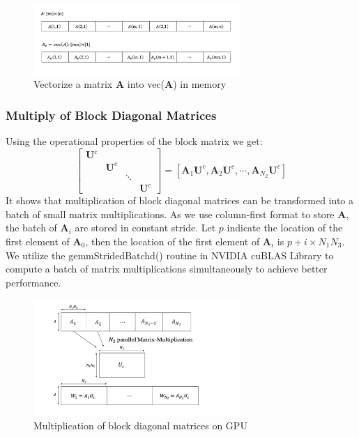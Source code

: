 \documentclass[futureinternet,article,submit,moreauthors,pdftex,10pt,a4paper]{Definitions/mdpi}
\theoremstyle{plain}
\theoremstyle{definition}
\theoremstyle{remark}
\begin{document}
\begin{figure}[H]
\centering
\includegraphics[width=0.7\textwidth]{vec2mat.png}
\caption{Vectorize a matrix $\mathbf{A}$ into vec($\mathbf{A}$) in memory}
\label{Fig:vec2mat}
\end{figure}

\subsubsection{Multiply of Block Diagonal Matrices}
Using the operational properties of the block matrix we get:
\begin{equation}
        [\mathbf{A}_1, \mathbf{A}_2, \cdots, \mathbf{A}_{N_2}]
        \begin{bmatrix}
            \mathbf{U}^c & & & \\
            & \mathbf{U}^c & & \\
            & & \ddots & \\
            & & & \mathbf{U}^c
        \end{bmatrix}
        =
        [\mathbf{A}_1\mathbf{U}^c, \mathbf{A}_2\mathbf{U}^c, \cdots, \mathbf{A}_{N_2}\mathbf{U}^c]
\label{step1}
\end{equation}
It shows that multiplication of block diagonal matrices can be transformed into a batch of small matrix multiplications. As we use column-first format to store $\mathbf{A}$, the batch of $\mathbf{A}_i$ are stored in constant stride. Let $p$ indicate the location of the first element of $\mathbf{A}_0$, then the location of the first element of $\mathbf{A}_i$ is $p+i\times N_1N_3$.  We utilize the gemmStridedBatchd() routine in NVIDIA cuBLAS Library to compute a batch of matrix multiplications simultaneously to achieve better performance.
\begin{figure}[H]
\centering
\includegraphics[width=0.7\textwidth]{diagMM.pdf}
\caption{Multiplication of block diagonal matrices on GPU}
\label{Fig:diagMM}
\end{figure}
\end{document}
